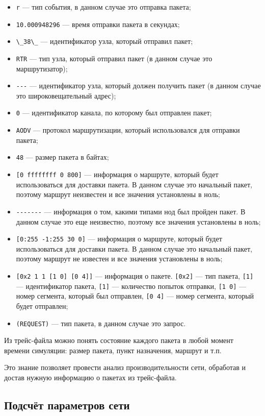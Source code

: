 \begin{itemize}
  \item \verb|r| --- тип события, в данном случае это отправка пакета;
  \item \verb|10.000948296| --- время отправки пакета в секундах;
  \item \verb|\_38\_| --- идентификатор узла, который отправил пакет;
  \item \verb|RTR| --- тип узла, который отправил пакет (в данном случае это маршрутизатор);
  \item \verb|---| --- идентификатор узла, который должен получить пакет (в данном случае это широковещательный адрес);
  \item \verb|0| --- идентификатор канала, по которому был отправлен пакет;
  \item \verb|AODV| --- протокол маршрутизации, который использовался для отправки пакета;
  \item \verb|48| --- размер пакета в байтах;
  \item \verb|[0 ffffffff 0 800]| --- информация о маршруте, который будет использоваться для доставки пакета. В данном случае это начальный пакет, поэтому маршрут неизвестен и все значения установлены в ноль;
  \item \verb|-------| --- информация о том, какими типами нод был пройден пакет. В данном случае это еще неизвестно, поэтому все значения установлены в ноль;
  \item \verb|[0:255 -1:255 30 0]| --- информация о маршруте, который будет использоваться для доставки пакета. В данном случае это начальный пакет, поэтому маршрут не известен и все значения установлены в ноль;
  \item \verb|[0x2 1 1 [1 0] [0 4]]| --- информация о пакете. \verb|[0x2]| --- тип пакета, \verb|[1]| --- идентификатор пакета, \verb|[1]| --- количество попыток отправки, \verb|[1 0]| --- номер сегмента, который был отправлен, \verb|[0 4]| --- номер сегмента, который будет отправлен;
  \item \verb|(REQUEST)| --- тип пакета, в данном случае это запрос.
\end{itemize}

Из трейс-файла можно понять состояние каждого пакета в любой момент времени симуляции: размер пакета, пункт назначения, маршрут и т.п.

Это знание позволяет провести анализ производительности сети, обработав и достав нужную информацию о пакетах из трейс-файла.

\subsection{Подсчёт параметров сети}

